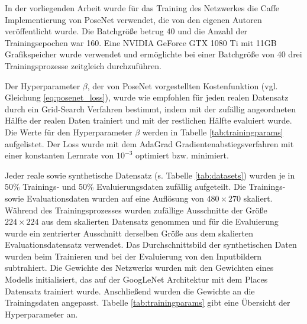 

In der vorliegenden Arbeit wurde für das Training des Netzwerkes die Caffe \cite{jiaCaffeConvolutionalArchitecture2014} Implementierung von PoseNet verwendet, die von den eigenen Autoren \citet{kendallPoseNetConvolutionalNetwork2015} veröffentlicht wurde. Die Batchgröße betrug 40 und die Anzahl der Trainingsepochen war 160. Eine NVIDIA GeForce GTX 1080 Ti mit 11GB Grafikspeicher wurde verwendet und ermöglichte bei einer Batchgröße von 40 drei Trainingsprozesse zeitgleich durchzuführen.

Der Hyperparameter $\beta$, der von PoseNet vorgestellten Kostenfunktion (vgl. Gleichung \ref{eq:posenet_loss}), wurde wie empfohlen für jeden realen Datensatz durch ein Grid-Search Verfahren bestimmt, indem mit der zufällig angeordneten Hälfte der realen Daten trainiert und mit der restlichen Hälfte evaluiert wurde. Die Werte für den Hyperparameter $\beta$ werden in Tabelle \ref{tab:trainingparams} aufgelistet. Der Loss wurde mit dem AdaGrad \cite{duchiAdaptiveSubgradientMethods2011} Gradientenabstiegsverfahren mit einer konstanten Lernrate von $10^{-3}$ optimiert bzw. minimiert. 

Jeder reale sowie synthetische Datensatz (s. Tabelle \ref{tab:datasets}) wurden je in 50\% Trainings- und 50\% Evaluierungsdaten zufällig aufgeteilt. Die Trainings- sowie Evaluationsdaten wurden auf eine Auflösung von $480\times270$ skaliert. Während des Trainingsprozesses wurden zufällige Ausschnitte der Größe $224 \times 224$ aus dem skalierten Datensatz genommen und für die Evaluierung wurde ein zentrierter Ausschnitt derselben Größe aus dem skalierten Evaluationsdatensatz verwendet. Das Durchschnittsbild der synthetischen Daten wurden beim Trainieren und bei der Evaluierung von den Inputbildern subtrahiert. 
Die Gewichte des Netzwerks wurden mit den Gewichten eines Modells initialisiert, das auf der GoogLeNet Architektur mit dem Places Datensatz trainiert wurde. Anschließend wurden die Gewichte an die Trainingsdaten angepasst. Tabelle \ref{tab:trainingparams} gibt eine Übersicht der Hyperparameter an.

